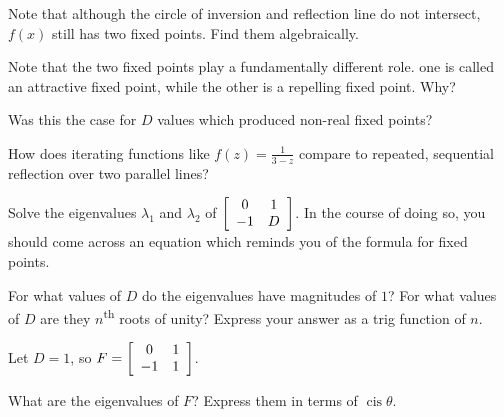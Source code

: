 \documentclass[../key.tex]{subfiles}
\begin{document}
\begin{inner_problem}
\item Note that although the circle of inversion and reflection line do not intersect, $f(x)$ still has two fixed points. Find them algebraically.
\end{inner_problem}

\begin{inner_problem}
\item Note that the two fixed points play a fundamentally different role. one is called an attractive fixed point, while the other is a repelling fixed point. Why?
\end{inner_problem}

\begin{inner_problem}
\item Was this the case for $D$ values which produced non-real fixed points?
\end{inner_problem}

\begin{inner_problem}
\item How does iterating functions like $f(z)=\frac{1}{3-z}$ compare to repeated, sequential reflection over two parallel lines?
\end{inner_problem}

\begin{outer_problem}
\item Solve the eigenvalues $\lambda_1$ and $\lambda_2$ of $\left[\begin{array}{cc} 0 & 1 \\ -1 & D \end{array}\right]$. In the course of doing so, you should come across an equation which reminds you of the formula for fixed points.
\end{outer_problem}

\begin{outer_problem}
\item For what values of $D$ do the eigenvalues have magnitudes of $1$? For what values of $D$ are they $n$\textsuperscript{th} roots of unity? Express your answer as a trig function of $n$.
\end{outer_problem}

\begin{outer_problem}
\item Let $D=1$, so $F=\left[\begin{array}{cc} 0 & 1 \\ -1 & 1 \end{array}\right]$.
\end{outer_problem}

\begin{inner_problem}[start=1]
\item What are the eigenvalues of $F$? Express them in terms of $\operatorname{cis} \theta$.
\end{inner_problem}
\end{document}
